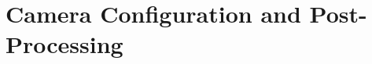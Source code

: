 \section{Camera Configuration and Post-Processing}\label{app:camera_configuration_and_postprocessing}

